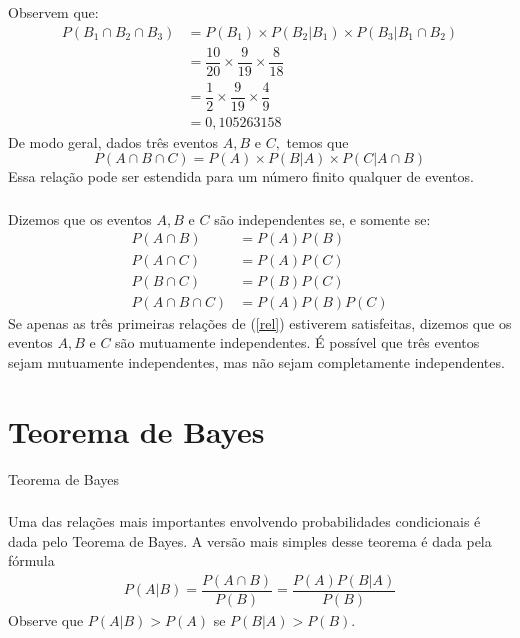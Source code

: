 \documentclass[14pt,aspectratio=1610]{beamer}
\begin{document}
\begin{frame}{}
\frametitle{}
\begin{block}{}
\justifying
Observem que:
\begin{align}
P(B_{1}\cap B_{2}\cap B_{3})&=P(B_{1})\times P(B_{2}|B_{1})\times P(B_{3}|B_{1}\cap B_{2})\\
&=\dfrac{10}{20}\times\dfrac{9}{19}\times\dfrac{8}{18}\\
&=\dfrac{1}{2}\times\dfrac{9}{19}\times\dfrac{4}{9}\\
&=0,105263158
\end{align}
De modo geral, dados três eventos $A, B$ e $C,$ temos que
$$P(A\cap B \cap C)=P(A)\times P(B|A)\times P(C|A\cap B)$$
Essa relação pode ser estendida para um número finito qualquer de eventos.
\end{block}
\end{frame}
% 
\begin{frame}{}
\frametitle{}
\begin{block}{}
\justifying
Dizemos que os eventos $A, B$ e $C$ são independentes se, e somente se:
\begin{align}\label{rel}
P(A\cap B)&=P(A)P(B)\\
\nonumber P(A\cap C)&=P(A)P(C)\\
\nonumber P(B\cap C)&=P(B)P(C)\\
\nonumber P(A\cap B\cap C)&=P(A)P(B)P(C)
\end{align}
Se apenas as três primeiras relações de (\ref{rel}) estiverem satisfeitas, dizemos que os eventos $A, B$ e $C$ são mutuamente independentes. É possível que três eventos sejam mutuamente independentes, mas não sejam completamente independentes.
\end{block}
\end{frame}
% 
\section{Teorema de Bayes}
\begin{frame}{Teorema de Bayes}
\frametitle{}
\begin{block}{}
\justifying
Uma das relações mais importantes envolvendo probabilidades condicionais é
dada pelo Teorema de Bayes. A versão mais simples desse teorema é dada pela
fórmula
\begin{align}
P(A|B)=\dfrac{P(A\cap B)}{P(B)}=\dfrac{P(A)P(B|A)}{P(B)}
\end{align}
Observe que $P(A|B) > P(A)$ se $P(B|A) > P(B).$
\end{block}
\end{frame}
\end{document}
